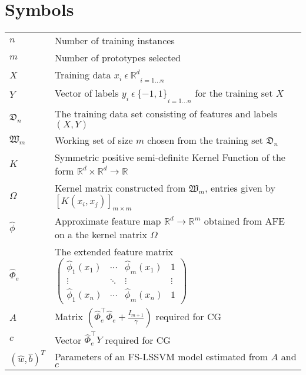 \documentclass[master=mai,masteroption=ecs]{kulemt}
\begin{document}
\section*{Symbols}
\begin{flushleft}
  \renewcommand{\arraystretch}{1.1}
  \begin{tabularx}{\textwidth}{@{}p{12mm}X@{}}
    $n$ & Number of training instances\\
    $m$ & Number of prototypes selected\\
    $X $   & Training data ${x_i \ \epsilon \ \mathbb{R}^d}_{i = 1 \hdots n}$ \\
    $Y$   & Vector of labels ${y_i \ \epsilon \ \{-1, 1\}}_{i = 1 \hdots n}$ for the training set $X$ \\
    $\mathfrak{D}_n$ & The training data set consisting of features and labels $(X, Y)$\\
    $\mathfrak{W}_m$ & Working set of size $m$ chosen from the training set $\mathfrak{D}_n$\\
    $K$ & Symmetric positive semi-definite Kernel Function of the form $\mathbb{R}^d \times \mathbb{R}^d \longrightarrow \mathbb{R}$ \\
    
    $\Omega$ & Kernel matrix constructed from $\mathfrak{W}_m$, entries given by $[K(x_i, x_j)]_{m \times m}$\\
    
    $\hat{\phi}$ & Approximate feature map $\mathbb{R}^d \longrightarrow \mathbb{R}^m$ obtained from AFE on a the kernel matrix $\Omega$ \\
    
    $\hat{\Phi}_e$ & The extended feature matrix $\begin{pmatrix}
\hat{\phi}_{1}(x_1) & \cdots & \hat{\phi}_{m}(x_1) & 1\\ 
\vdots &  \ddots & \vdots & \vdots\\ 
\hat{\phi}_{1}(x_n) & \cdots & \hat{\phi}_{m}(x_n) & 1
\end{pmatrix}$ \\
    $A$ & Matrix $\left (\hat{\Phi}^{\intercal}_e \hat{\Phi}_e + \frac{\mathit{I}_{m+1}}{\gamma} \right )$ required for CG\\
    $c$ & Vector $ \hat{\Phi}^{\intercal}_e Y$ required for CG\\
    $(\hat{w}, \hat{b})^T$ & Parameters of an FS-LSSVM model estimated from $A$ and $c$ \\
  \end{tabularx}
\end{flushleft}

\mainmatter








\appendixpage*          %
\appendix



\backmatter


\end{document}
